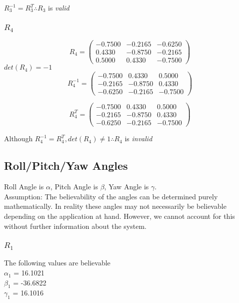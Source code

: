			\hspace{30mm}$R_{3}^{-1} = R_{3}^{T}\therefore R_{3}$ is \emph{valid}
				
		\subsubsection{$R_{4}$}
			$$
			R_{4} =
			\begin{pmatrix}
				-0.7500 & -0.2165 & -0.6250\\
				0.4330 & -0.8750 & -0.2165\\
				0.5000  & 0.4330  & -0.7500
			\end{pmatrix}
			$$
			\hspace{35mm}$det(R_{4}) = -1$
			\\
			$$
			R_{4}^{-1} =
			\begin{pmatrix}
				-0.7500 & 0.4330 & 0.5000\\
				-0.2165 & -0.8750 & 0.4330\\
				-0.6250  & -0.2165  & -0.7500
			\end{pmatrix}
			$$
				
			$$
			R_{4}^{T} =
			\begin{pmatrix}
				-0.7500 & 0.4330 & 0.5000\\
				-0.2165 & -0.8750 & 0.4330\\
				-0.6250  & -0.2165  & -0.7500
			\end{pmatrix}
			$$
					
			\hspace{30mm}Although $R_{4}^{-1} = R_{4}^{T}, det(R_{4}) \neq 1 \therefore R_{4}$ is \emph{invalid}
					
	\newpage
	\subsection{Roll/Pitch/Yaw Angles}
		Roll Angle is $\alpha$,
		Pitch Angle is $\beta$,
		Yaw Angle is $\gamma$.\\
	Assumption: The believability of the angles can be determined purely mathematically. In reality these angles may not necessarily be believable depending on the application at hand. However, we cannot account for this without further information about the system.
		\subsubsection{$R_{1}$}
		The following values are believable\\
			$\alpha_{1}$ = 16.1021\degree\\ 
			$\beta_{1}$ = -36.6822\degree\\ 
			$\gamma_{1}$ = 16.1016\degree\\
